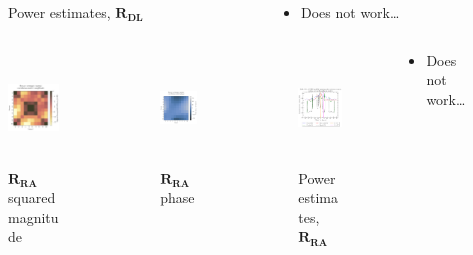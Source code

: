 \documentclass[UKenglish,8pt,aspectratio=1610]{beamer}
\begin{document}
\begin{frame}
\begin{columns}
\begin{column}{0.25\textwidth}
\begin{figure}[h!]
	\caption{Power estimates, $\mathbf{R_{DL}}$}
\end{figure}
\end{column}
	\begin{column}{0.25\textwidth}
\begin{itemize}
	\item Does not work\dots
\end{itemize}
\end{column}
\end{columns}
\vspace{-13pt}
\begin{columns}
	\begin{column}{0.25\textwidth}
		\begin{figure}[h!]
			\centering
			\includegraphics[height=3cm]{question8/matrices/rotary_averaged_spatial_correlation_matrix_amplitude.pdf}
			\caption{$\mathbf{R_{RA}}$ squared magnitude}
		\end{figure}
	\end{column}
	\begin{column}{0.25\textwidth}
		\begin{figure}[h!]
			\centering
			\includegraphics[height=3cm]{question8/matrices/rotary_averaged_spatial_correlation_matrix_phase.pdf}
			\caption{$\mathbf{R_{RA}}$ phase}
		\end{figure}
	\end{column}
	\begin{column}{0.25\textwidth}
		\begin{figure}[h!]
			\centering
			\includegraphics[height=3cm]{question8/spectrums/part_A_question_8_all_spectrums_rotary_averaged.pdf}
			\caption{Power estimates, $\mathbf{R_{RA}}$}
		\end{figure}
	\end{column}
	\begin{column}{0.25\textwidth}
		\begin{itemize}
			\item Does not work\dots
		\end{itemize}
	\end{column}
\end{columns}

\end{frame}
\end{document}
